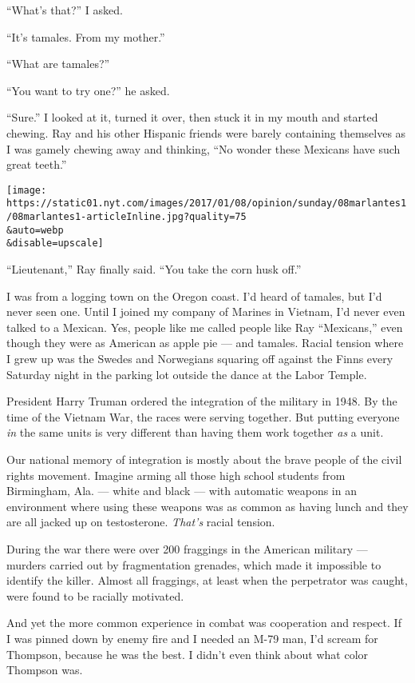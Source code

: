 ``What's that?'' I asked.

``It's tamales. From my mother.''

``What are tamales?''

``You want to try one?'' he asked.

``Sure.'' I looked at it, turned it over, then stuck it in my mouth and
started chewing. Ray and his other Hispanic friends were barely
containing themselves as I was gamely chewing away and thinking, ``No
wonder these Mexicans have such great teeth.''

\texttt{[image: https://static01.nyt.com/images/2017/01/08/opinion/sunday/08marlantes1/08marlantes1-articleInline.jpg?quality=75\\\&auto=webp\\\&disable=upscale]}

``Lieutenant,'' Ray finally said. ``You take the corn husk off.''

I was from a logging town on the Oregon coast. I'd heard of tamales, but
I'd never seen one. Until I joined my company of Marines in Vietnam, I'd
never even talked to a Mexican. Yes, people like me called people like
Ray ``Mexicans,'' even though they were as American as apple pie --- and
tamales. Racial tension where I grew up was the Swedes and Norwegians
squaring off against the Finns every Saturday night in the parking lot
outside the dance at the Labor Temple.

President Harry Truman ordered the integration of the military in 1948.
By the time of the Vietnam War, the races were serving together. But
putting everyone \emph{in} the same units is very different than having
them work together \emph{as} a unit.

Our national memory of integration is mostly about the brave people of
the civil rights movement. Imagine arming all those high school students
from Birmingham, Ala. --- white and black --- with automatic weapons in
an environment where using these weapons was as common as having lunch
and they are all jacked up on testosterone. \emph{That's} racial
tension.

During the war there were over 200 fraggings in the American military
--- murders carried out by fragmentation grenades, which made it
impossible to identify the killer. Almost all fraggings, at least when
the perpetrator was caught, were found to be racially motivated.

And yet the more common experience in combat was cooperation and
respect. If I was pinned down by enemy fire and I needed an M-79 man,
I'd scream for Thompson, because he was the best. I didn't even think
about what color Thompson was.

